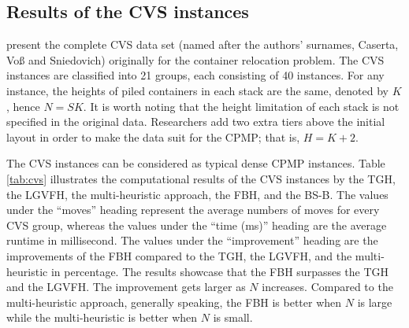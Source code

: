 \documentclass[review,3p,times,12pt,number]{elsarticle}\usepackage{amsmath}\usepackage{amssymb}
\renewcommand{\citet}[1]{\citeauthor{#1} \citep{#1}}
\begin{document}
\subsection{Results of the CVS instances}

\citet{cas2011} present the complete CVS data set (named after the authors' surnames, Caserta, Vo{\ss} and Sniedovich) originally for the container relocation problem. The CVS instances are classified into 21 groups, each consisting of 40 instances.
For any instance, the heights of piled containers in each stack are the same, denoted by $K$, hence $N=SK$. It is worth noting that the height limitation of each stack is not specified in the original data.
Researchers add two extra tiers above the initial layout in order to make the data suit for the CPMP; that is, $H=K+2$.

The CVS instances can be considered as typical dense CPMP instances.
Table \ref{tab:cvs} illustrates the computational results of the CVS instances by the TGH, the LGVFH, the multi-heuristic approach, the FBH, and the BS-B\@.
The values under the ``moves'' heading represent the average numbers of moves for every CVS group, whereas the values under the ``time (ms)'' heading are the average runtime in millisecond.
The values under the ``improvement'' heading are the improvements of the FBH compared to the TGH, the LGVFH, and the multi-heuristic in percentage.
The results showcase that the FBH surpasses the TGH and the LGVFH. The improvement gets larger as $N$ increases. Compared to the multi-heuristic approach, generally speaking, the FBH is better when $N$ is large while the multi-heuristic is better when $N$ is small.
\end{document}
